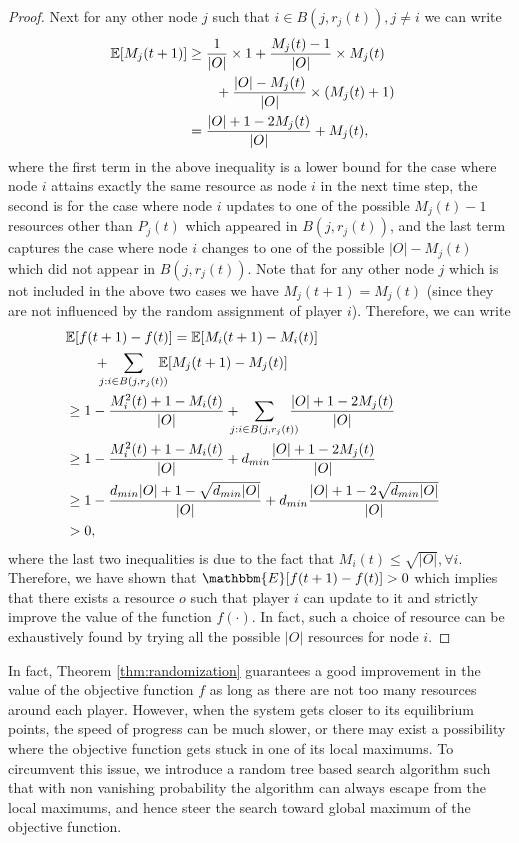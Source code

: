 \begin{proof}
Next for any other node $j$ such that $i\in B(j, r_j(t)), j\neq i$ we can write
\begin{align}\nonumber
\mathbb{E}[M_j(t+1)]&\ge \frac{1}{|O|}\times 1+\frac{M_j(t)-1}{|O|}\times M_j(t)\cr 
&\qquad+\frac{|O|-M_j(t)}{|O|}\times (M_j(t)+1)\cr
&=\frac{|O|+1-2M_j(t)}{|O|}+M_j(t),
\end{align}
where the first term in the above inequality is a lower bound for the case where node $i$ attains exactly the same resource as node $i$ in the next time step, the second is for the case where node $i$ updates to one of the possible $M_j(t)-1$ resources other than $P_j(t)$ which appeared in $B(j, r_j(t))$, and the last term captures the case where node $i$ changes to one of the possible $|O|-M_j(t)$ which did not appear in $B(j, r_j(t))$. Note that for any other node $j$ which is not included in the above two cases we have $M_j(t+1)=M_j(t)$ (since they are not influenced by the random assignment of player $i$). Therefore, we can write
\begin{align}\nonumber
&\mathbb{E}[f(t+1)-f(t)]=\mathbb{E}[M_i(t+1)-M_i(t)]\cr 
&\qquad+\!\!\!\!\!\sum_{j: i\in B(j, r_j(t))}\!\!\!\!\!\mathbb{E}[M_j(t+1)-M_j(t)]\cr 
&\ge 1-\frac{M_i^2(t)+1-M_i(t)}{|O|}+\!\!\!\!\!\sum_{j: i\in B(j, r_j(t))}\!\!\!\!\!\frac{|O|+1-2M_j(t)}{|O|}\cr 
&\ge 1-\frac{M_i^2(t)+1-M_i(t)}{|O|}+d_{min}\frac{|O|+1-2M_j(t)}{|O|}\cr 
&\ge 1-\frac{d_{min}|O|+1-\sqrt{d_{min}|O|}}{|O|}+d_{min}\frac{|O|+1-2\sqrt{d_{min}|O|}}{|O|}\cr 
&> 0,
\end{align}
where the last two inequalities is due to the fact that $M_i(t)\leq \sqrt{|O|}, \forall i$. Therefore, we have shown that $\mathbbm{E}[f(t+1)-f(t)]>0$ which implies that there exists a resource $o$ such that player $i$ can update to it and strictly improve the value of the function $f(\cdot)$. In fact, such a choice of resource can be exhaustively found by trying all the possible $|O|$ resources for node $i$.
\end{proof}

In fact, Theorem \ref{thm:randomization} guarantees a good improvement in the value of the objective function $f$ as long as there are not too many resources around each player. However, when the system gets closer to its equilibrium points, the speed of progress can be much slower, or there may exist a possibility where the objective function gets stuck in one of its local maximums. To circumvent this issue, we introduce a random tree based search algorithm such that with non vanishing probability the algorithm can always escape from the local maximums, and hence steer the search toward global maximum of the objective function. 
